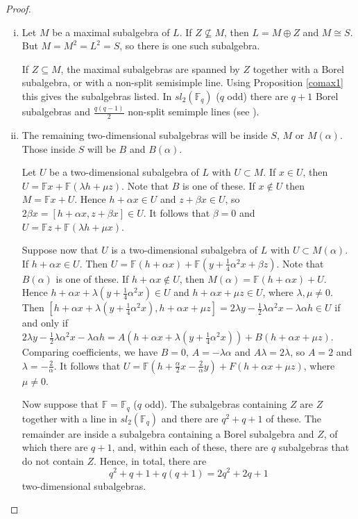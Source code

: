 \documentclass[11pt]{amsart}
\theoremstyle{plain}
\def\F{\mathbb{F}}
\begin{document}
\begin{proof} 
\begin{enumerate}[(i)]
\item Let $M$ be a maximal subalgebra of $L$. If $Z\not\subseteq M$, then $L=M\oplus Z$ and $M\cong S$. But $M=M^2=L^2=S$, so there is one such subalgebra.
\par

If $Z\subseteq M$, the maximal subalgebras are spanned by $Z$ together with a Borel subalgebra, or with a non-split semisimple line. Using Proposition \ref{comax1} this gives the subalgebras listed. In $sl_2(\F_q)$ ($q$ odd) there are $q+1$ Borel subalgebras and $\frac{q(q-1)}{2}$ non-split semimple lines (see \cite[Proposition 4.10]{TZG}).

\item  The remaining two-dimensional subalgebras will be inside $S$, $M$ or $M(\alpha)$. Those inside $S$ will be $B$ and $B(\alpha)$.
\par

Let $U$ be a two-dimensional subalgebra of $L$ with $U\subset M$. If $x\in U$, then $U=\F x+\F (\lambda h+\mu z)$. Note that $B$ is one of these. If $x\notin U$ then $M=\F x+U$. Hence $h+\alpha x\in U$ and $z+\beta x\in U$, so $2\beta x=[h+\alpha x,z+\beta x]\in U$. It follows that $\beta=0$ and $U=\F z+\F (\lambda h+\mu x)$.
\par

Suppose now that $U$ is a two-dimensional subalgebra of $L$ with $U\subset M(\alpha)$. If $h+\alpha x\in U$. Then $U=\F (h+\alpha x)+\F (y +\frac{1}{4} \alpha^2 x+\beta z)$. Note that $B(\alpha)$ is one of these. If $h+\alpha x\notin U$, then $M(\alpha)=\F (h+\alpha x)+U$. Hence $h+\alpha x+\lambda(y+\frac{1}{4} \alpha^2 x)\in U$ and $h+\alpha x+\mu z\in U$, where $\lambda,\mu\not=0$. Then $[h+\alpha x+\lambda(y+\frac{1}{4} \alpha^2 x),h+\alpha x+\mu z]=2\lambda y-\frac{1}{2}\lambda\alpha^2 x-\lambda\alpha h\in U$ if and only if $2\lambda y-\frac{1}{2}\lambda\alpha^2 x-\lambda\alpha h=A(h+\alpha x+\lambda(y+\frac{1}{4} \alpha^2 x))+B(h+\alpha x+\mu z)$. Comparing coefficients, we have $B=0$, $A=-\lambda\alpha$ and $A\lambda=2\lambda$, so $A=2$ and $\lambda=-\frac{2}{\alpha}$. It follows that $U=\F (h+\frac{\alpha}{2} x -\frac{2}{\alpha} y)+F(h+\alpha x+\mu z)$, where $\mu\not=0$.
\par

Now suppose that $\F=\F_q$ ($q$ odd). The subalgebras containing $Z$ are $Z$ together with a line in $sl_2(\F_q)$ and there are $q^2+q+1$ of these. The remainder are inside a subalgebra containing a Borel subalgebra and $Z$, of which there are $q+1$, and, within each of these, there are $q$ subalgebras that do not contain $Z$. Hence, in total, there are $$q^2+q+1+q(q+1)=2q^2+2q+1$$ two-dimensional subalgebras.
\end{enumerate}
\end{proof}
\end{document}
